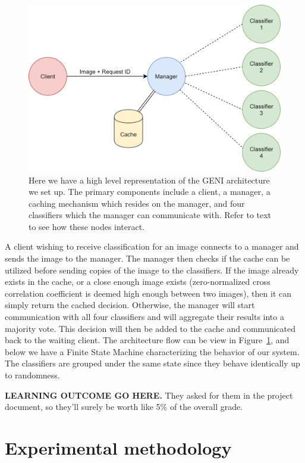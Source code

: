 \documentclass[12pt]{article}
\begin{document}
\begin{figure}
    \centering
    \includegraphics[scale=0.2]{networksArchitecture.png}
    \caption{Here we have a high level representation of the GENI architecture we set up. The primary components include a client, a manager, a caching mechanism which resides on the manager, and four classifiers which the manager can communicate with. Refer to text to see how these nodes interact.}
    \label{fig:architecture}
\end{figure}

A client wishing to receive classification for an image connects to a manager and sends the image to the manager. The manager then checks if the cache can be utilized before sending copies of the image to the classifiers. If the image already exists in the cache, or a close enough image exists (zero-normalized cross correlation coefficient is deemed high enough between two images), then it can simply return the cached decision. Otherwise, the manager will start communication with all four classifiers and will aggregate their results into a majority vote. This decision will then be added to the cache and communicated back to the waiting client. The architecture flow can be view in Figure~\ref{fig:architecture}, and below we have a Finite State Machine characterizing the behavior of our system. The classifiers are grouped under the same state since they behave identically up to randomness.

{\bf LEARNING OUTCOME GO HERE.} 
They asked for them in the project document, so they'll surely be worth like 5\% of the overall grade.

\section{Experimental methodology}
\end{document}
